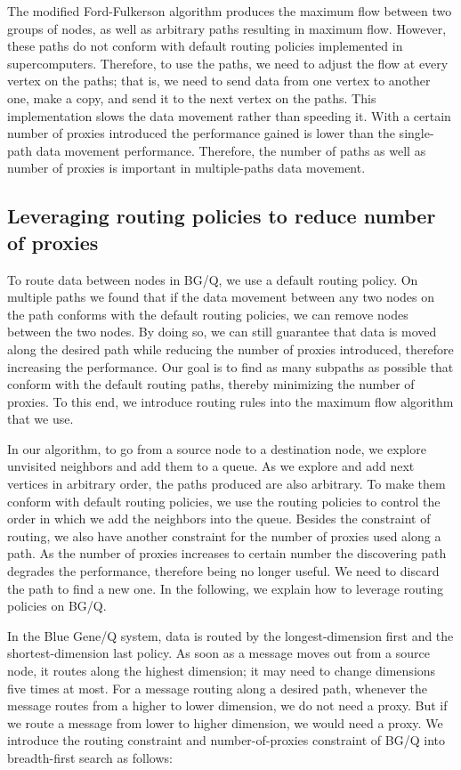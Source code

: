 \documentclass[final,5p,times]{elsarticle}
\begin{document}
The modified Ford-Fulkerson algorithm produces the maximum flow between two groups of nodes, as well as arbitrary paths resulting in maximum flow. However, these paths do not conform with default routing policies implemented in supercomputers. Therefore, to use the paths, we need to adjust the flow at every vertex on the paths; that is, we need to send data from one vertex to another one, make a copy, and send it to the next vertex on the paths. This implementation slows the data movement rather than speeding it. With a certain number of proxies introduced the performance gained is lower than the single-path data movement performance. Therefore, the number of paths as well as number of proxies is important in multiple-paths data movement.

\subsection{Leveraging routing policies to reduce number of proxies}
To route data between nodes in BG/Q, we use a default routing policy. On multiple paths we found that if the data movement between any two nodes on the path conforms with the default routing policies, we can remove nodes between the two nodes. By doing so, we can  still guarantee that data is moved along the desired path while reducing the number of proxies introduced, therefore increasing the performance. Our goal is to find as many subpaths as possible that conform with the default routing paths, thereby minimizing the number of proxies. To this end, we introduce routing rules into the maximum flow algorithm that we use.

In our algorithm, to go from a source node to a destination node, we explore unvisited neighbors and add them to a queue. As we explore and add next vertices in arbitrary order, the paths produced are also arbitrary. To make them conform with default routing policies, we use the routing policies to control the order in which we add the neighbors into the queue. Besides the constraint of routing, we also have another constraint for the number of proxies used along a path. As the number of proxies increases to certain number the discovering path degrades the performance, therefore being no longer useful. We need to discard the path to find a new one. In the following, we explain how to leverage routing policies on BG/Q.

In the Blue Gene/Q system, data is routed by the longest-dimension first and the shortest-dimension last policy. As soon as a message moves out from a source node, it routes along the highest dimension; it may need to change dimensions five times at most. For a message routing along a desired path, whenever the message routes from a higher to lower dimension, we do not need a proxy. But if we route a message from lower to higher dimension, we would need a proxy. We introduce the routing constraint and number-of-proxies constraint of BG/Q into breadth-first search as follows:
\end{document}
